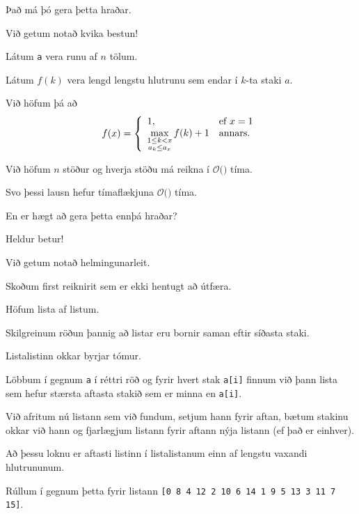 {
	{
		\item<1-> Það má þó gera þetta hraðar.
		\item<2-> Við getum notað kvika bestun!
		\item<3-> Látum \texttt{a} vera runu af $n$ tölum.
		\item<4-> Látum $f(k)$ vera lengd lengstu hlutrunu sem endar í $k$-ta staki $a$.
		\item<5-> Við höfum þá að
		\[
			f(x) = \left \{
			\env{array}
			{ {l l}
				1, & \text{ef $x = 1$} \\
				\displaystyle \max_{\substack{1 \leq k < x\\a_k \leq a_x}} f(k) + 1 & \text{annars.}
			}
			\right .
		\]
	}
}

{
}

{
	{
		\item<1-> Við höfum $n$ stöður og hverja stöðu má reikna í $\mathcal{O}($$)$ tíma.
		\item<3-> Svo þessi lausn hefur tímaflækjuna $\mathcal{O}($$)$ tíma.
	}
}

{
	{
		\item<1-> En er hægt að gera þetta ennþá hraðar?
		\item<2-> Heldur betur!
		\item<3-> Við getum notað helmingunarleit.
		\item<4-> Skoðum first reiknirit sem er ekki hentugt að útfæra.
	}
}

{
	{
		\item<1-> Höfum lista af listum.
		\item<2-> Skilgreinum röðun þannig að listar eru bornir saman eftir síðasta staki.
		\item<3-> Listalistinn okkar byrjar tómur.
		\item<4-> Löbbum í gegnum \texttt{a} í réttri röð og fyrir hvert stak \texttt{a[i]} finnum við
			þann lista sem hefur stærsta aftasta stakið sem er minna en \texttt{a[i]}.
		\item<5-> Við afritum nú listann sem við fundum, setjum hann fyrir aftan, bætum stakinu okkar við hann
			og fjarlægjum listann fyrir aftann nýja listann (ef það er einhver).
		\item<6-> Að þessu loknu er aftasti listinn í listalistanum einn af lengstu vaxandi hlutrununum.
		\item<7-> Rúllum í gegnum þetta fyrir listann \texttt{[0 8 4 12 2 10 6 14 1 9 5 13 3 11 7 15]}.
	}
}

